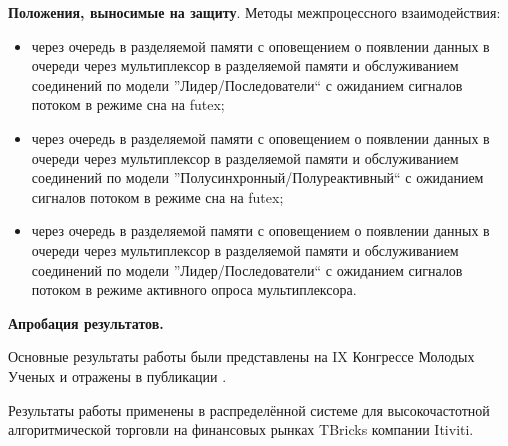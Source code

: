 \textbf{Положения, выносимые на защиту}. Методы межпроцессного взаимодействия:
\begin{itemize}
\item через очередь в разделяемой памяти с оповещением о появлении данных в очереди через мультиплексор в разделяемой памяти и обслуживанием соединений по модели ''Лидер/Последователи`` с ожиданием сигналов потоком в режиме сна на futex;
\item через очередь в разделяемой памяти с оповещением о появлении данных в очереди через мультиплексор в разделяемой памяти и обслуживанием соединений по модели ''Полусинхронный/Полуреактивный`` с ожиданием сигналов потоком в режиме сна на futex;
\item через очередь в разделяемой памяти с оповещением о появлении данных в очереди через мультиплексор в разделяемой памяти и обслуживанием соединений по модели ''Лидер/Последователи`` с ожиданием сигналов потоком в режиме активного опроса мультиплексора.
\end{itemize}


\textbf{Апробация результатов.}

Основные результаты работы были представлены на IX Конгрессе Молодых Ученых и отражены в публикации \cite{GubarevKMU20}.

Результаты работы применены в распределённой системе для высокочастотной алгоритмической торговли на финансовых рынках TBricks компании Itiviti.
